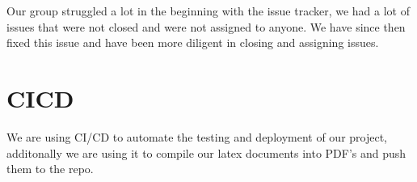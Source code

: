 \documentclass{article}
\begin{document}
Our group struggled a lot in the beginning with the issue tracker, we had a lot of issues that were not closed and were not assigned to anyone. We have since then fixed this issue and have been more diligent in closing and assigning issues.

\section{CICD}

We are using CI/CD to automate the testing and deployment of our project, additonally we are using it to compile our latex documents into PDF's and push them to the repo.
\end{document}
